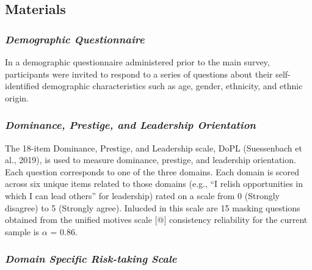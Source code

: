 \documentclass[
  donotrepeattitle,doc, 12pt, a4paper,floatsintext]{apa7}
\begin{document}
\hypertarget{materials}{%
\subsection{Materials}\label{materials}}

\hypertarget{demographic-questionnaire}{%
\subsubsection{\texorpdfstring{\emph{Demographic Questionnaire}}{Demographic Questionnaire}}\label{demographic-questionnaire}}

In a demographic questionnaire administered prior to the main survey, participants were invited to respond to a series of questions about their self-identified demographic characteristics such as age, gender, ethnicity, and ethnic origin.

\hypertarget{dominance-prestige-and-leadership-orientation-1}{%
\subsubsection{\texorpdfstring{\emph{Dominance, Prestige, and Leadership Orientation}}{Dominance, Prestige, and Leadership Orientation}}\label{dominance-prestige-and-leadership-orientation-1}}

The 18-item Dominance, Prestige, and Leadership scale, DoPL (Suessenbach et al., 2019), is used to measure dominance, prestige, and leadership orientation. Each question corresponds to one of the three domains. Each domain is scored across six unique items related to those domains (e.g., ``I relish opportunities in which I can lead others'' for leadership) rated on a scale from 0 (Strongly disagree) to 5 (Strongly agree). Inlucded in this scale are 15 masking questions obtained from the unified motives scale {[}@{]} consistency reliability for the current sample is \(\alpha\) = 0.86.

\hypertarget{domain-specific-risk-taking-scale}{%
\subsubsection{\texorpdfstring{\emph{Domain Specific Risk-taking Scale}}{Domain Specific Risk-taking Scale}}\label{domain-specific-risk-taking-scale}}
\end{document}
